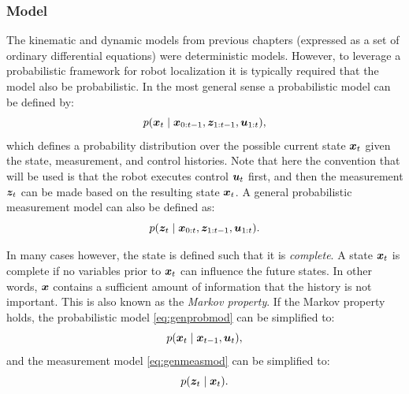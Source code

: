 \subsubsection{Model}
The kinematic and dynamic models from previous chapters (expressed as a set of ordinary differential equations) were deterministic models. However, to leverage a probabilistic framework for robot localization it is typically required that the model also be probabilistic. In the most general sense a probabilistic model can be defined by:
\begin{equation} \label{eq:genprobmod}
p(\bm{x}_t \mid \bm{x}_{0:t-1}, \bm{z}_{1:t-1}, \bm{u}_{1:t}),
\end{equation}
which defines a probability distribution over the possible current state $\bm{x}_t$ given the state, measurement, and control histories. Note that here the convention that will be used is that the robot executes control $\bm{u}_t$ first, and then the measurement $\bm{z}_t$ can be made based on the resulting state $\bm{x}_t$. A general probabilistic measurement model can also be defined as:
\begin{equation} \label{eq:genmeasmod}
p(\bm{z}_t \mid \bm{x}_{0:t}, \bm{z}_{1:t-1}, \bm{u}_{1:t}).
\end{equation}

In many cases however, the state is defined such that it is \textit{complete}. A state $\bm{x}_t$ is complete if no variables prior to $\bm{x}_t$ can influence the future states. In other words, $\bm{x}$ contains a sufficient amount of information that the history is not important. This is also known as the \textit{Markov property}. If the Markov property holds, the probabilistic model \eqref{eq:genprobmod} can be simplified to:
\begin{equation} \label{eq:markovprobmod}
p(\bm{x}_t \mid \bm{x}_{t-1}, \bm{u}_{t}),
\end{equation}
and the measurement model \eqref{eq:genmeasmod} can be simplified to:
\begin{equation} \label{eq:markovmeasmod}
p(\bm{z}_t \mid \bm{x}_{t}).
\end{equation}

